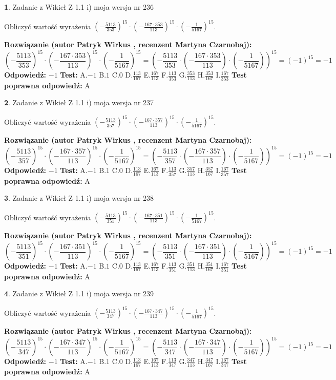 \documentclass[12pt, a4paper]{article}
\theoremstyle{definition} %
\newtheorem{zad}{}
\newcommand{\zadStart}[1]{\begin{zad}#1\newline}
\newcommand{\zadStop}{\end{zad}}
\newcommand{\rozwStart}[2]{\noindent \textbf{Rozwiązanie (autor #1 , recenzent #2): }\newline}
\newcommand{\rozwStop}{\newline}
\newcommand{\odpStart}{\noindent \textbf{Odpowiedź:}\newline}
\newcommand{\odpStop}{\newline}
\newcommand{\testStart}{\noindent \textbf{Test:}\newline}
\newcommand{\testStop}{\newline}
\newcommand{\kluczStart}{\noindent \textbf{Test poprawna odpowiedź:}\newline}
\newcommand{\kluczStop}{\newline}
\begin{document}
\zadStart{Zadanie z Wikieł Z 1.1 i) moja wersja nr 236}

Obliczyć wartość wyrażenia $(-\frac{5113}{353})^{15} \cdot (-\frac{167 \cdot 353}{113})^{15} \cdot (-\frac{1}{5167})^{15}$.
\zadStop
\rozwStart{Patryk Wirkus}{Martyna Czarnobaj}
$$(-\frac{5113}{353})^{15} \cdot (-\frac{167 \cdot 353}{113})^{15} \cdot (-\frac{1}{5167})^{15} = (-\frac{5113}{353} \cdot (-\frac{167 \cdot 353}{113}) \cdot (-\frac{1}{5167}))^{15} = (-1)^{15} = -1$$
\rozwStop
\odpStart
$-1$
\odpStop
\testStart
A.$-1$ B.$1$ C.$0$ D.$\frac{113}{167}$ E.$\frac{167}{113}$
F.$\frac{113}{353}$ G.$\frac{353}{113}$
H.$\frac{353}{167}$
I.$\frac{167}{353}$
\testStop
\kluczStart
A
\kluczStop



\zadStart{Zadanie z Wikieł Z 1.1 i) moja wersja nr 237}

Obliczyć wartość wyrażenia $(-\frac{5113}{357})^{15} \cdot (-\frac{167 \cdot 357}{113})^{15} \cdot (-\frac{1}{5167})^{15}$.
\zadStop
\rozwStart{Patryk Wirkus}{Martyna Czarnobaj}
$$(-\frac{5113}{357})^{15} \cdot (-\frac{167 \cdot 357}{113})^{15} \cdot (-\frac{1}{5167})^{15} = (-\frac{5113}{357} \cdot (-\frac{167 \cdot 357}{113}) \cdot (-\frac{1}{5167}))^{15} = (-1)^{15} = -1$$
\rozwStop
\odpStart
$-1$
\odpStop
\testStart
A.$-1$ B.$1$ C.$0$ D.$\frac{113}{167}$ E.$\frac{167}{113}$
F.$\frac{113}{357}$ G.$\frac{357}{113}$
H.$\frac{357}{167}$
I.$\frac{167}{357}$
\testStop
\kluczStart
A
\kluczStop



\zadStart{Zadanie z Wikieł Z 1.1 i) moja wersja nr 238}

Obliczyć wartość wyrażenia $(-\frac{5113}{351})^{15} \cdot (-\frac{167 \cdot 351}{113})^{15} \cdot (-\frac{1}{5167})^{15}$.
\zadStop
\rozwStart{Patryk Wirkus}{Martyna Czarnobaj}
$$(-\frac{5113}{351})^{15} \cdot (-\frac{167 \cdot 351}{113})^{15} \cdot (-\frac{1}{5167})^{15} = (-\frac{5113}{351} \cdot (-\frac{167 \cdot 351}{113}) \cdot (-\frac{1}{5167}))^{15} = (-1)^{15} = -1$$
\rozwStop
\odpStart
$-1$
\odpStop
\testStart
A.$-1$ B.$1$ C.$0$ D.$\frac{113}{167}$ E.$\frac{167}{113}$
F.$\frac{113}{351}$ G.$\frac{351}{113}$
H.$\frac{351}{167}$
I.$\frac{167}{351}$
\testStop
\kluczStart
A
\kluczStop



\zadStart{Zadanie z Wikieł Z 1.1 i) moja wersja nr 239}

Obliczyć wartość wyrażenia $(-\frac{5113}{347})^{15} \cdot (-\frac{167 \cdot 347}{113})^{15} \cdot (-\frac{1}{5167})^{15}$.
\zadStop
\rozwStart{Patryk Wirkus}{Martyna Czarnobaj}
$$(-\frac{5113}{347})^{15} \cdot (-\frac{167 \cdot 347}{113})^{15} \cdot (-\frac{1}{5167})^{15} = (-\frac{5113}{347} \cdot (-\frac{167 \cdot 347}{113}) \cdot (-\frac{1}{5167}))^{15} = (-1)^{15} = -1$$
\rozwStop
\odpStart
$-1$
\odpStop
\testStart
A.$-1$ B.$1$ C.$0$ D.$\frac{113}{167}$ E.$\frac{167}{113}$
F.$\frac{113}{347}$ G.$\frac{347}{113}$
H.$\frac{347}{167}$
I.$\frac{167}{347}$
\testStop
\kluczStart
A
\kluczStop
\end{document}
